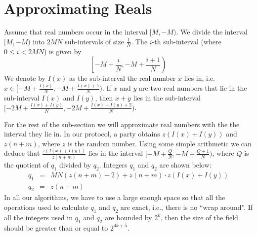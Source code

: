 

\section{Approximating Reals}
\label{sec:approximating-reals}

Assume that real numbers occur in the interval $[M,-M)$. We divide
the interval $[M,-M)$ into $2MN$ sub-intervals of size $\frac{1}{N}$.
The $i$-th sub-interval (where $0 \leq i < 2MN$) is given by
\[
\left[ -M + \frac{i}{N}, -M + \frac{i+1}{N} \right)
\]
We denote by $I(x)$ as the sub-interval the real number $x$ lies in,
i.e.  $x \in [-M + \frac{I(x)}{N}, -M + \frac{I(x)+1}{N} )$. If $x$
and $y$ are two real numbers that lie in the sub-interval $I(x)$ and $I(y)$,
then $x+y$ lies in the sub-interval $[ -2M + \frac{I(x)+I(y)}{N}, -2M
+ \frac{I(x)+I(y)+2}{N})$.

For the rest of the sub-section we will approximate real numbers with
the the interval they lie in. In our protocol, a party obtains 
$z (I(x)+I(y))$ and $z (n+m)$, where $z$ is the random number. 
Using some simple arithmetic we can deduce that $\frac{z (I(x)+I(y))}{z(n+m)}$
lies in the interval $[-M + \frac{Q}{N}, -M+\frac{Q+1}{N} )$, where 
$Q$ is the quotient of $q_1$ divided by $q_2$. Integers $q_1$ and 
$q_2$ are shown below:
\begin{eqnarray*}
q_1 & = & MN ( z (n+m) -2) + z(n+m) \cdot z (I(x)+I(y)) \\
q_2 & = & z (n+m)
\end{eqnarray*}
In all our algorithms, we have to use a large enough space so that
all the operations used to calculate $q_1$ and $q_2$ are exact, i.e.,
there is no ``wrap around''. If all the integers used in $q_1$ and
$q_2$ are bounded by $2^k$, then the size of the field should be 
greater than or equal to $2^{4k+5}$. 





